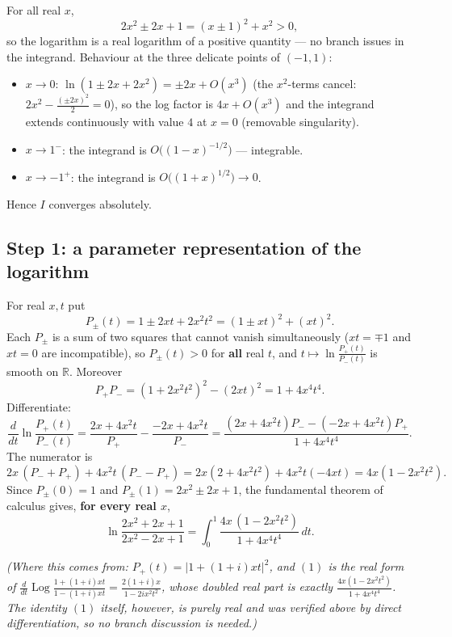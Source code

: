 \documentclass[11pt]{article}
\theoremstyle{remark}
\begin{document}
For all real $x$,
$$2x^2\pm 2x+1=(x\pm1)^2+x^2>0,$$
so the logarithm is a real logarithm of a positive quantity --- no branch issues in the integrand. Behaviour at the three delicate points of $(-1,1)$:

\begin{itemize}
\item $x\to0$: $\ln(1\pm2x+2x^2)=\pm2x+O(x^3)$ (the $x^2$-terms cancel: $2x^2-\tfrac{(\pm2x)^2}{2}=0$), so the log factor is $4x+O(x^3)$ and the integrand extends continuously with value $4$ at $x=0$ (removable singularity).
\item $x\to1^-$: the integrand is $O\big((1-x)^{-1/2}\big)$ --- integrable.
\item $x\to-1^+$: the integrand is $O\big((1+x)^{1/2}\big)\to0$.
\end{itemize}

Hence $I$ converges absolutely.

\subsection*{Step 1: a parameter representation of the logarithm}

For real $x,t$ put
$$P_\pm(t)=1\pm 2xt+2x^2t^2=(1\pm xt)^2+(xt)^2 .$$
Each $P_\pm$ is a sum of two squares that cannot vanish simultaneously ($xt=\mp1$ and $xt=0$ are incompatible), so $P_\pm(t)>0$ for \textbf{all} real $t$, and $t\mapsto\ln\frac{P_+(t)}{P_-(t)}$ is smooth on $\mathbb R$. Moreover
$$P_+P_-=(1+2x^2t^2)^2-(2xt)^2=1+4x^4t^4 .$$
Differentiate:
$$\frac{d}{dt}\ln\frac{P_+(t)}{P_-(t)}
=\frac{2x+4x^2t}{P_+}-\frac{-2x+4x^2t}{P_-}
=\frac{(2x+4x^2t)P_- -(-2x+4x^2t)P_+}{1+4x^4t^4}.$$
The numerator is
$$2x\,(P_-+P_+)+4x^2t\,(P_--P_+)=2x(2+4x^2t^2)+4x^2t(-4xt)=4x\left(1-2x^2t^2\right).$$
Since $P_\pm(0)=1$ and $P_\pm(1)=2x^2\pm2x+1$, the fundamental theorem of calculus gives, \textbf{for every real $x$},
\begin{equation}\ln\frac{2x^2+2x+1}{2x^2-2x+1}=\int_0^1\frac{4x\,(1-2x^2t^2)}{1+4x^4t^4}\,dt. \tag{1}\end{equation}

\textit{(Where this comes from: $P_+(t)=\lvert1+(1+i)xt\rvert^2$, and $(1)$ is the real form of $\frac{d}{dt}\operatorname{Log}\frac{1+(1+i)xt}{1-(1+i)xt}=\frac{2(1+i)x}{1-2ix^2t^2}$, whose doubled real part is exactly $\frac{4x(1-2x^2t^2)}{1+4x^4t^4}$. The identity $(1)$ itself, however, is purely real and was verified above by direct differentiation, so no branch discussion is needed.)}
\end{document}
